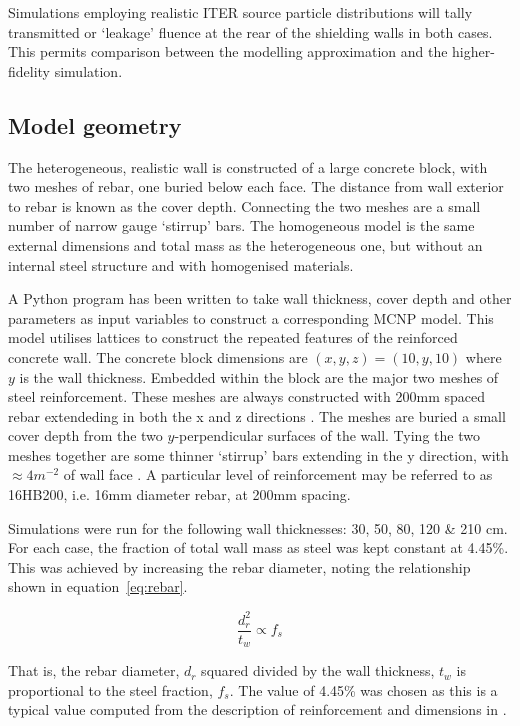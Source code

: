 Simulations employing realistic ITER source particle distributions will tally transmitted or `leakage' fluence at the rear of the shielding walls in both cases. This permits comparison between the modelling approximation and the higher-fidelity simulation.

\subsection{Model geometry}
The heterogeneous, realistic wall is constructed of a large concrete block, with two meshes of rebar, one buried below each face. The distance from wall exterior to rebar is known as the cover depth. Connecting the two meshes are a small number of narrow gauge `stirrup' bars. The homogeneous model is the same external dimensions and total mass as the heterogeneous one, but without an internal steel structure and with homogenised materials.

A Python program has been written to take wall thickness, cover depth and other parameters as input variables to construct a corresponding MCNP model. This model utilises lattices to construct the repeated features of the reinforced concrete wall. The concrete block dimensions are $(x, y, z) = (10, y, 10)$ where $y$ is the wall thickness. Embedded within the block are the major two meshes of steel reinforcement. These meshes are always constructed with 200mm spaced rebar extendeding in both the x and z directions \cite{Perez2014}. The meshes are buried a small cover depth from the two $y$-perpendicular surfaces of the wall. Tying the two meshes together are some thinner `stirrup' bars extending in the y direction, with $\approx 4m^{-2}$ of wall face \cite{Perez2014}. A particular level of reinforcement may be referred to as 16HB200, i.e. 16mm diameter rebar, at 200mm spacing.

Simulations were run for the following wall thicknesses: 30, 50, 80, 120 \& 210 cm. For each case, the fraction of total wall mass as steel was kept constant at 4.45\%. This was achieved by increasing the rebar diameter, noting the relationship shown in equation~\ref{eq:rebar}. 

\begin{equation}
  \label{eq:rebar}
  \frac{d^{2}_{r}}{t_{w}} \propto f_{s}
\end{equation}

That is, the rebar diameter, $d_{r}$ squared divided by the wall thickness, $t_{w}$ is proportional to the steel fraction, $f_{s}$. The value of 4.45\% was chosen as this is a typical value computed from the description of reinforcement and dimensions in \cite{Perez2014}. 

